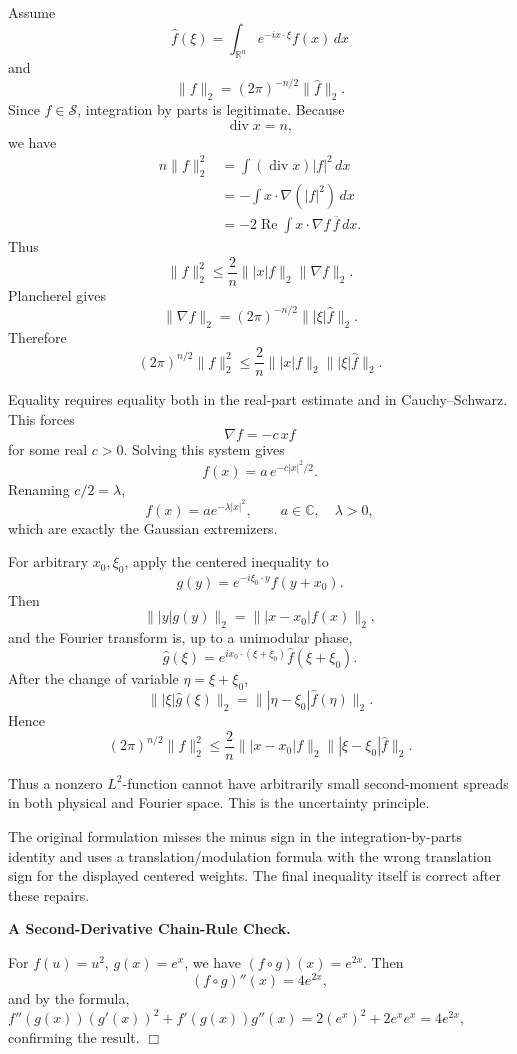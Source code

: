 \begin{solution}
Assume
\[
\widehat f(\xi)
=
\int_{\mathbb R^n}e^{-ix\cdot\xi}f(x)\,dx
\]
and
\[
\|f\|_2
=
(2\pi)^{-n/2}\|\widehat f\|_2.
\]
Since \(f\in\mathcal S\), integration by parts is legitimate. Because
\[
\operatorname{div}x=n,
\]
we have
\[
\begin{aligned}
n\|f\|_2^2
&=
\int
(\operatorname{div}x)|f|^2\,dx\\
&=
-\int
x\cdot\nabla(|f|^2)\,dx\\
&=
-2\operatorname{Re}
\int
x\cdot\nabla f\,\overline f\,dx.
\end{aligned}
\]
Thus
\[
\|f\|_2^2
\le
\frac2n
\||x|f\|_2
\|\nabla f\|_2.
\]
Plancherel gives
\[
\|\nabla f\|_2
=
(2\pi)^{-n/2}
\||\xi|\widehat f\|_2.
\]
Therefore
\[
\boxed{
(2\pi)^{n/2}\|f\|_2^2
\le
\frac2n
\||x|f\|_2
\||\xi|\widehat f\|_2.
}
\]

Equality requires equality both in the real-part estimate and in Cauchy--Schwarz. This forces
\[
\nabla f=-c\,x f
\]
for some real \(c>0\). Solving this system gives
\[
f(x)=a\,e^{-c|x|^2/2}.
\]
Renaming \(c/2=\lambda\),
\[
\boxed{
f(x)=a e^{-\lambda|x|^2},
\qquad
a\in\mathbb C,\quad \lambda>0,
}
\]
which are exactly the Gaussian extremizers.

For arbitrary \(x_0,\xi_0\), apply the centered inequality to
\[
g(y)
=
e^{-i\xi_0\cdot y}f(y+x_0).
\]
Then
\[
\||y|g(y)\|_2
=
\||x-x_0|f(x)\|_2,
\]
and the Fourier transform is, up to a unimodular phase,
\[
\widehat g(\xi)
=
e^{ix_0\cdot(\xi+\xi_0)}
\widehat f(\xi+\xi_0).
\]
After the change of variable \(\eta=\xi+\xi_0\),
\[
\||\xi|\widehat g(\xi)\|_2
=
\||\eta-\xi_0|\widehat f(\eta)\|_2.
\]
Hence
\[
\boxed{
(2\pi)^{n/2}\|f\|_2^2
\le
\frac2n
\||x-x_0|f\|_2
\||\xi-\xi_0|\widehat f\|_2.
}
\]

Thus a nonzero \(L^2\)-function cannot have arbitrarily small second-moment spreads in both
physical and Fourier space. This is the uncertainty principle.

The original formulation misses the minus sign in the integration-by-parts identity and uses a
translation/modulation formula with the wrong translation sign for the displayed centered
weights. The final inequality itself is correct after these repairs.
\end{solution}


\begin{problem}[CP-II-0337]
\label{prob:cp-ii-0337}
\textbf{A Second-Derivative Chain-Rule Check.}

\hspace*{1.5em}For $f(u)=u^2$, $g(x)=e^x$, we have $(f\circ g)(x)=e^{2x}$.
Then
\[
(f\circ g)''(x)=4e^{2x},
\]
and by the formula,
$f''(g(x))(g'(x))^2+f'(g(x))g''(x)=2(e^x)^2+2e^x e^x=4e^{2x}$, confirming the result.
\hfill$\Box$

\bigskip
\bigskip
\end{problem}

